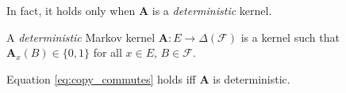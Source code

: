 In fact, it holds only when $\mathbf{A}$ is a \emph{deterministic} kernel.

\begin{definition}
A \emph{deterministic} Markov kernel $\mathbf{A}:E\to \Delta(\mathcal{F})$ is a kernel such that $\mathbf{A}_x(B)\in\{0,1\}$ for all $x\in E$, $B\in\mathcal{F}$.
\end{definition}

\begin{theorem}
Equation \ref{eq:copy_commutes} holds iff $\mathbf{A}$ is deterministic.
\end{theorem}











